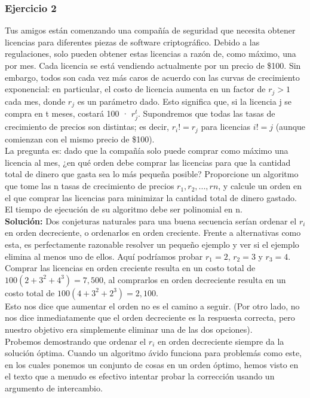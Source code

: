 \documentclass[a4paper]{article}
\begin{document}
\subsubsection{Ejercicio 2}

Tus amigos están comenzando una compañía de seguridad que necesita obtener licencias para diferentes piezas de software criptográfico. Debido a las regulaciones, solo pueden obtener estas licencias a razón de, como máximo, una por mes. Cada licencia se está vendiendo actualmente por un precio de \$100. Sin embargo, todos son cada vez más caros de acuerdo con las curvas de crecimiento exponencial: en particular, el costo de licencia aumenta en un factor de $r_j>1$ cada mes, donde $r_j$ es un parámetro dado. Esto significa que, si la licencia j se compra en t meses, costará 100 · $r^t_j$. Supondremos que todas las tasas de crecimiento de precios son distintas; es decir, $r_i != r_j$ para licencias $i != j$ (aunque comienzan con el mismo precio de \$100).\\

La pregunta es: dado que la compañía solo puede comprar como máximo una licencia al mes, ¿en qué orden debe comprar las licencias para que la cantidad total de dinero que gasta sea lo más pequeña posible? Proporcione un algoritmo que tome las n tasas de crecimiento de precios $r_1,r_2,...,rn$, y calcule un orden en el que comprar las licencias para minimizar la cantidad total de dinero gastado. El tiempo de ejecución de su algoritmo debe ser polinomial en n.\\

\textbf{Solución:} Dos conjeturas naturales para una buena secuencia serían ordenar el $r_i$ en orden decreciente, o ordenarlos en orden creciente. Frente a alternativas como esta, es perfectamente razonable resolver un pequeño ejemplo y ver si el ejemplo elimina al menos uno de ellos. Aquí podríamos probar $r_1=2$, $r_2=3$ y $r_3=4$. Comprar las licencias en orden creciente resulta en un costo total de $100(2+3^2+4^3) =7,500$, al comprarlos en orden decreciente resulta en un costo total de $100(4+3^2+2^3)=2,100$.\\

Esto nos dice que aumentar el orden no es el camino a seguir. (Por otro lado, no nos dice inmediatamente que el orden decreciente es la respuesta correcta, pero nuestro objetivo era simplemente eliminar una de las dos opciones).\\

 Probemos demostrando que ordenar el $r_i$ en orden decreciente siempre da la solución óptima. Cuando un algoritmo ávido funciona para problemás como este, en los cuales ponemos un conjunto de cosas en un orden óptimo, hemos visto en el texto que a menudo es efectivo intentar probar la corrección usando un argumento de intercambio.\\
 
\end{document}
